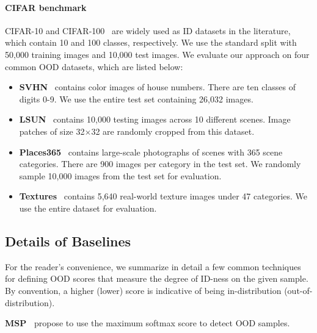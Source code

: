 \documentclass{article}
\begin{document}
\paragraph{CIFAR benchmark} CIFAR-10 and CIFAR-100~\cite{krizhevsky2009learning} are widely used as ID datasets in the literature, which contain 10 and 100 classes, respectively. We use the standard split with 50,000 training images and 10,000 test images. We evaluate our approach on four common OOD datasets, which are listed below:
\begin{itemize}
    \item \textbf{SVHN}~\cite{netzer2011reading} contains color images of house numbers. There are ten classes of digits 0-9. We use the entire test set containing 26,032 images.
    \vspace{-0.1cm}
    \item \textbf{LSUN}~\cite{yu2015lsun} contains 10,000 testing images across 10 different scenes. Image patches of size 32$\times$32 are randomly cropped from this dataset.
    \vspace{-0.1cm}
    \item \textbf{Places365}~\cite{zhou2017places} contains large-scale photographs of scenes with 365 scene categories. There are 900 images per category in the test set. We randomly sample 10,000 images from the test set for evaluation.
    \vspace{-0.1cm}
    \item \textbf{Textures}~\cite{cimpoi14describing} contains 5,640 real-world texture images under 47 categories. We use the entire dataset for evaluation.
\end{itemize}

\subsection{Details of Baselines}
\label{app:baseline}

For the reader's convenience, we summarize in detail a few common techniques for defining OOD scores that measure the degree of ID-ness on the given sample.
By convention, a higher (lower) score is indicative of being in-distribution (out-of-distribution).














\textbf{MSP~\cite{hendrycks2016baseline}} propose to use the maximum softmax score to detect OOD samples.
\end{document}
